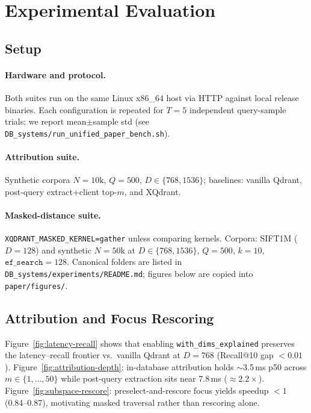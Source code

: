 \documentclass[11pt,a4paper]{article}
\begin{document}
\section{Experimental Evaluation}
\label{sec:eval}

\subsection{Setup}

\paragraph{Hardware and protocol.}
Both suites run on the same Linux x86\_64 host via HTTP against local release
binaries. Each configuration is repeated for $T{=}5$ independent query-sample
trials; we report mean$\pm$sample std (see
\texttt{DB\_systems/run\_unified\_paper\_bench.sh}).

\paragraph{Attribution suite.}
Synthetic corpora $N{=}10\mathrm{k}$, $Q{=}500$, $D\in\{768,1536\}$;
baselines: vanilla Qdrant, post-query extract+client top-$m$, and XQdrant.

\paragraph{Masked-distance suite.}
\texttt{XQDRANT\_MASKED\_KERNEL=gather} unless comparing kernels.
Corpora: SIFT1M ($D{=}128$) and synthetic $N{=}50\mathrm{k}$ at $D\in\{768,1536\}$,
$Q{=}500$, $k{=}10$, $\texttt{ef\_search}{=}128$.
Canonical folders are listed in \texttt{DB\_systems/experiments/README.md};
figures below are copied into \texttt{paper/figures/}.

\FloatBarrier
\subsection{Attribution and Focus Rescoring}
\label{sec:eval-attr}

Figure~\ref{fig:latency-recall} shows that enabling
\texttt{with\_dims\_explained} preserves the latency--recall frontier vs.\ vanilla
Qdrant at $D{=}768$ (Recall@10 gap $<0.01$).
Figure~\ref{fig:attribution-depth}: in-database attribution holds $\sim$3.5\,ms p50
across $m\in\{1,\ldots,50\}$ while post-query extraction sits near 7.8\,ms
($\approx 2.2\times$).
Figure~\ref{fig:subspace-rescore}: preselect-and-rescore focus yields speedup
$<1$ (0.84--0.87), motivating masked traversal rather than rescoring alone.
\end{document}
